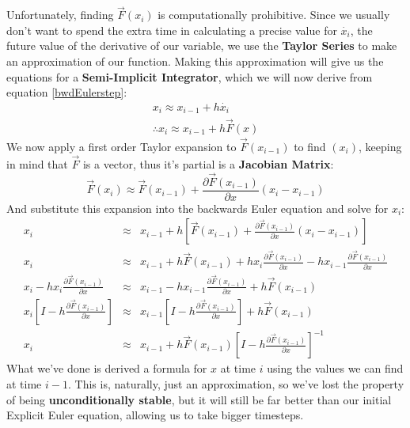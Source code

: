\documentclass[]{article}
\begin{document}
Unfortunately, finding $\vec{F}(x_i)$ is computationally prohibitive. Since we usually don't want to spend the extra time in calculating a precise value for $\dot{x_i}$, the future value of the derivative of our variable, we use the \textbf{Taylor Series} to make an approximation of our function. Making this approximation will give us the equations for a \textbf{Semi-Implicit Integrator}, which we will now derive from equation \ref{bwdEulerstep}:
\begin{eqnarray}
	x_i \approx x_{i-1} + h\dot{x_i} \\
	\therefore x_i \approx x_{i-1} + h\vec{F}(x)
\end{eqnarray}
We now apply a first order Taylor expansion to $\vec{F}(x_{i-1})$ to find $(x_i)$, keeping in mind that $\vec{F}$ is a vector, thus it's partial is a \textbf{Jacobian Matrix}:
\begin{equation}
	\vec{F}(x_i) \approx \vec{F}(x_{i-1}) + \frac{\partial \vec{F}(x_{i-1})}{\partial x}(x_i - x_{i-1})
\end{equation}
And substitute this expansion into the backwards Euler equation and solve for $x_i$:
\begin{eqnarray}
	x_i & \approx & x_{i-1} + h\left[ \vec{F}(x_{i-1}) + \frac{\partial \vec{F}(x_{i-1})}{\partial x}(x_i - x_{i-1}) \right] \\
	x_i & \approx & x_{i-1} + h\vec{F}(x_{i-1}) + hx_i\frac{\partial \vec{F}(x_{i-1})}{\partial x} - hx_{i-1}\frac{\partial \vec{F}(x_{i-1})}{\partial x} \\
	x_i - hx_i\frac{\partial \vec{F}(x_{i-1})}{\partial x} & \approx & x_{i-1} - hx_{i-1}\frac{\partial \vec{F}(x_{i-1})}{\partial x} + h\vec{F}(x_{i-1}) \\
	x_i\left[ I - h\frac{\partial \vec{F}(x_{i-1})}{\partial x} \right] & \approx & x_{i-1} \left[ I - h\frac{\partial \vec{F}(x_{i-1})}{\partial x} \right] + h\vec{F}(x_{i-1})\\
	x_i & \approx & x_{i-1} + h\vec{F}(x_{i-1})\left[ I - h\frac{\partial \vec{F}(x_{i-1})}{\partial x} \right]^{-1} \label{semiimplEuler}
\end{eqnarray}
What we've done is derived a formula for $x$ at time $i$ using the values we can find at time $i-1$. This is, naturally, just an approximation, so we've lost the property of being \textbf{unconditionally stable}, but it will still be far better than our initial Explicit Euler equation, allowing us to take bigger timesteps.

\paragraph{}
\end{document}
